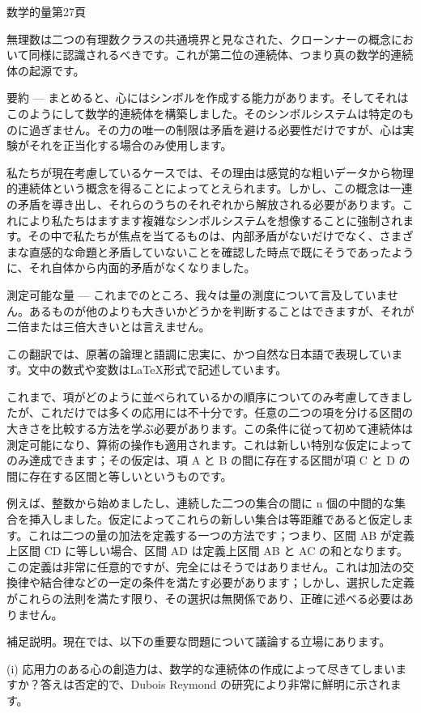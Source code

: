 \documentclass[a4paper,11pt,openany]{ltjsbook}
\begin{document}
数学的量第27頁

無理数は二つの有理数クラスの共通境界と見なされた、クローンナーの概念において同様に認識されるべきです。これが第二位の連続体、つまり真の数学的連続体の起源です。

要約 — まとめると、心にはシンボルを作成する能力があります。そしてそれはこのようにして数学的連続体を構築しました。そのシンボルシステムは特定のものに過ぎません。その力の唯一の制限は矛盾を避ける必要性だけですが、心は実験がそれを正当化する場合のみ使用します。

私たちが現在考慮しているケースでは、その理由は感覚的な粗いデータから物理的連続体という概念を得ることによってとえられます。しかし、この概念は一連の矛盾を導き出し、それらのうちのそれぞれから解放される必要があります。これにより私たちはますます複雑なシンボルシステムを想像することに強制されます。その中で私たちが焦点を当てるものは、内部矛盾がないだけでなく、さまざまな直感的な命題と矛盾していないことを確認した時点で既にそうであったように、それ自体から内面的矛盾がなくなりました。

測定可能な量 — これまでのところ、我々は量の測度について言及していません。あるものが他のよりも大きいかどうかを判断することはできますが、それが二倍または三倍大きいとは言えません。

この翻訳では、原著の論理と語調に忠実に、かつ自然な日本語で表現しています。文中の数式や変数はLaTeX形式で記述しています。

これまで、項がどのように並べられているかの順序についてのみ考慮してきましたが、これだけでは多くの応用には不十分です。任意の二つの項を分ける区間の大きさを比較する方法を学ぶ必要があります。この条件に従って初めて連続体は測定可能になり、算術の操作も適用されます。これは新しい特別な仮定によってのみ達成できます；その仮定は、項 A と B の間に存在する区間が項 C と D の間に存在する区間と等しいというものです。

例えば、整数から始めましたし、連続した二つの集合の間に n 個の中間的な集合を挿入しました。仮定によってこれらの新しい集合は等距離であると仮定します。これは二つの量の加法を定義する一つの方法です；つまり、区間 AB が定義上区間 CD に等しい場合、区間 AD は定義上区間 AB と AC の和となります。この定義は非常に任意的ですが、完全にはそうではありません。これは加法の交換律や結合律などの一定の条件を満たす必要があります；しかし、選択した定義がこれらの法則を満たす限り、その選択は無関係であり、正確に述べる必要はありません。

補足説明。現在では、以下の重要な問題について議論する立場にあります。

(i) 応用力のある心の創造力は、数学的な連続体の作成によって尽きてしまいますか？答えは否定的で、Dubois Reymond の研究により非常に鮮明に示されます。
\end{document}
